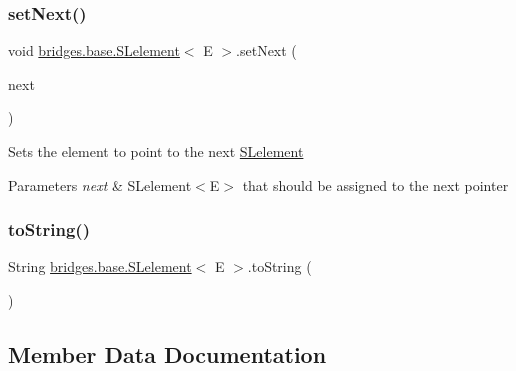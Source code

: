 \mbox{\label{classbridges_1_1base_1_1_s_lelement_afdd42f03071b2614822b73729e1a5a1a}} 
\subsubsection{\texorpdfstring{setNext()}{setNext()}}
{\footnotesize\ttfamily void \mbox{\hyperlink{classbridges_1_1base_1_1_s_lelement}{bridges.\+base.\+S\+Lelement}}$<$ E $>$.set\+Next (\begin{DoxyParamCaption}\item[{\mbox{\hyperlink{classbridges_1_1base_1_1_s_lelement}{S\+Lelement}}$<$ E $>$}]{next }\end{DoxyParamCaption})}

Sets the element to point to the next \mbox{\hyperlink{classbridges_1_1base_1_1_s_lelement}{S\+Lelement}}


\begin{DoxyParams}{Parameters}
{\em next} & S\+Lelement$<$\+E$>$ that should be assigned to the next pointer \\
\hline
\end{DoxyParams}
\mbox{\label{classbridges_1_1base_1_1_s_lelement_af0ec4da5b29d0f5ab6ab38e91cca51f9}} 
\subsubsection{\texorpdfstring{toString()}{toString()}}
{\footnotesize\ttfamily String \mbox{\hyperlink{classbridges_1_1base_1_1_s_lelement}{bridges.\+base.\+S\+Lelement}}$<$ E $>$.to\+String (\begin{DoxyParamCaption}{ }\end{DoxyParamCaption})}



\subsection{Member Data Documentation}
\mbox{\label{classbridges_1_1base_1_1_s_lelement_abf61c96a74ad319d561c6952ea388e0e}} 
